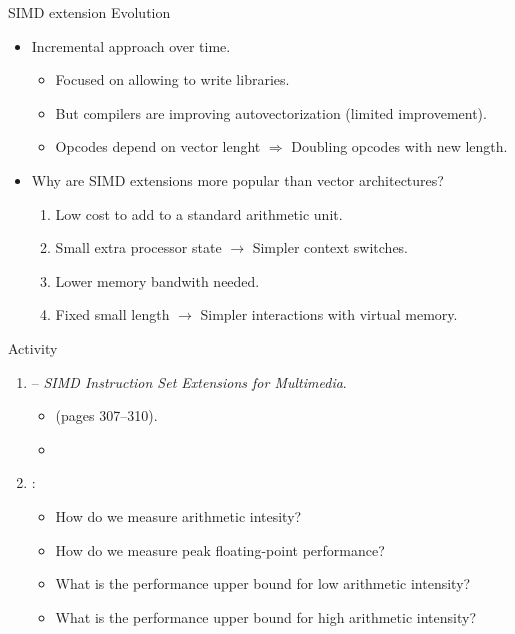 \begin{frame}[t]{SIMD extension Evolution}
\begin{itemize}
  \item Incremental approach over time.
    \begin{itemize}
      \item Focused on allowing to write libraries.
      \item But compilers are improving autovectorization (limited improvement).
      \item Opcodes depend on vector lenght $\Rightarrow$ Doubling opcodes with new length.
    \end{itemize}

  \item Why are SIMD extensions more popular than vector architectures?
    \begin{enumerate}
      \item Low cost to add to a standard arithmetic unit.
      \item Small extra processor state $\rightarrow$ Simpler context switches.
      \item Lower memory bandwith needed.
      \item Fixed small length $\rightarrow$ Simpler interactions with virtual memory.
    \end{enumerate}
\end{itemize}
\end{frame}

\begin{frame}[t]{Activity}
\begin{enumerate}
  \item {}  --
        \emph{SIMD Instruction Set Extensions for Multimedia}.
    \begin{itemize}
      \item {} 
            (pages 307--310).
      \item \credithennessy
    \end{itemize}

  \item {}:
    \begin{itemize}
      \item How do we measure arithmetic intesity?
      \item How do we measure peak floating-point performance?
      \item What is the performance upper bound for low arithmetic intensity?
      \item What is the performance upper bound for high arithmetic intensity?
    \end{itemize}
\end{enumerate}
\end{frame}
